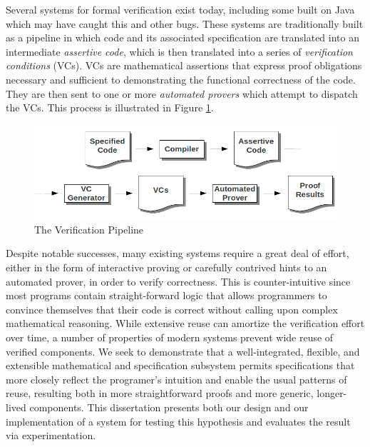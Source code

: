 Several systems for formal verification exist today, including some built on Java which may have caught this and other bugs.  These systems are traditionally built as a pipeline in which code and its associated specification are translated into an intermediate \emph{assertive code}, which is then translated into a series of \emph{verification conditions} (VCs).  VCs are mathematical assertions that express proof obligations necessary and sufficient to demonstrating the functional correctness of the code.  They are then sent to one or more \emph{automated provers} which attempt to dispatch the VCs.  This process is illustrated in Figure \ref{fig:pipeline}.

\begin{figure}
  \centering
    \includegraphics[width=\textwidth]{verification_pipeline}
  \caption{The Verification Pipeline\label{fig:pipeline}}
\end{figure}

Despite notable successes, many existing systems require a great deal of effort, either in the form of interactive proving or carefully contrived hints to an automated prover, in order to verify correctness.  This is counter-intuitive since most programs contain straight-forward logic that allows programmers to convince themselves that their code is correct without calling upon complex mathematical reasoning.  While extensive reuse can amortize the verification effort over time, a number of properties of modern systems prevent wide reuse of verified components.  We seek to demonstrate that a well-integrated, flexible, and extensible mathematical and specification subsystem permits specifications that more closely reflect the programer's intuition and enable the usual patterns of reuse, resulting both in more straightforward proofs and more generic, longer-lived components.  This dissertation presents both our design and our implementation of a system for testing this hypothesis and evaluates the result via experimentation.

